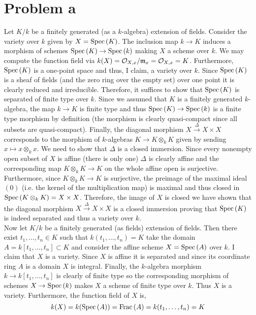 \documentclass[12pt]{article}
\begin{document}

\renewcommand{\P}{\mathbb{P}}

\section{Problem a}
Let $K / k$ be a finitely generated (as a $k$-algebra) extension of fields. Consider the variety over $k$ given by $X = \mathrm{Spec}\left( K \right)$. The inclusion map $k \to K$ induces a morphism of schemes $\mathrm{Spec}\left( K \right) \to \mathrm{Spec}\left( k \right)$ making $X$ a scheme over $k$. We may compute the function field via $k(X) = \mathcal{O}_{X, x} / \mathfrak{m}_x = \mathcal{O}_{X, x} = K$.   Furthermore, $\mathrm{Spec}\left( K \right)$ is a one-point space and thus, I claim, a variety over $k$. Since $\mathrm{Spec}\left( K \right)$ is a sheaf of fields (and the zero ring over the empty set) over one point it is clearly reduced and irreducible. Therefore, it suffices to show that $\mathrm{Spec}\left( K \right)$ is separated of finite type over $k$. Since we assumed that $K$ is a finitely generated $k$-algebra, the map $k \to K$ is finite type and thus $\mathrm{Spec}\left( K \right) \to \mathrm{Spec}\left( k \right)$ is a finite type morphism by definition (the morphism is clearly quasi-compact since all subsets are quasi-compact). Finally, the diagonal morphism $X \xrightarrow{\Delta} X \times X$ corresponds to the morphism of $k$-algebras $K \to K \otimes_k K$ given by sending $x \mapsto x \otimes_k x$. We need to show that $\Delta$ is a closed immersion. Since every nonempty open subset of $X$ is affine (there is only one) $\Delta$ is clearly affine and the corresponding map $K \otimes_k K \to K$ on the whole affine open is surjective. Furthermore, since $K \otimes_k K \to K$ is surjective, the preimage of the maximal ideal $(0)$ (i.e. the kernel of the multiplication map) is maximal and thus closed in $\mathrm{Spec}\left( K \otimes_k K \right) = X \times X$. Therefore, the image of $X$ is closed we have shown that the diagonal morphism $X \xrightarrow{\Delta} X \times X$ is a closed immersion proving that $\mathrm{Spec}\left( K \right)$ is indeed separated and thus a variety over $k$. 
\bigskip\\
Now let $K / k$ be a finitely generated (as fields) extension of fields. Then there exist $t_1, \dots, t_n \in K$ such that $k(t_1, \dots, t_n) = K$ take the domain $A = k[t_1, \dots, t_n] \subset K$ and consider the affine scheme $X = \mathrm{Spec}\left( A \right)$ over $k$. I claim that $X$ is a variety. Since $X$ is affine it is separated and since its coordinate ring $A$ is a domain $X$ is integral. Finally, the $k$-algebra morphism $k \to k[t_1, \dots, t_n]$ is clearly of finite type so the corresponding morphism of schemes $X \to \mathrm{Spec}\left( k \right)$ makes $X$ a scheme of finite type over $k$. Thus $X$ is a variety. Furthermore, the function field of $X$ is,
\[ k(X) = k(\mathrm{Spec}\left( A \right)) = \mathrm{Frac}\left(A\right) = k(t_1, \dots, t_n) = K \]
\end{document}
